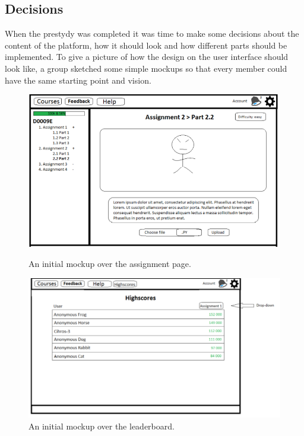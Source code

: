 \documentclass[a4paper,12pt]{article}
\begin{document}
\subsection{Decisions} 
When the prestydy was completed it was time to make some decisions about the content of the platform, how it should look and how different parts should be implemented. To give a picture of how the design on the user interface should look like, a group sketched some simple mockups
so that every member could have the same starting point and vision. 

\begin{figure}[H]
  \centering
  \begin{minipage}[b]{0.7\textwidth}
    \includegraphics[width=\textwidth]{mockup1}
    \caption{An initial mockup over the assignment page.}
  \end{minipage}
  \hfill
  \begin{minipage}[b]{0.7\textwidth}
    \includegraphics[width=\textwidth]{mockup2}
    \caption{An initial mockup over the leaderboard.}
  \end{minipage}
\end{figure}
\end{document}
